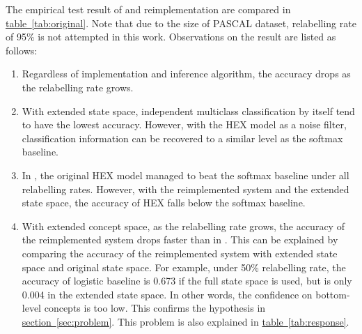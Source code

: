 \documentclass[11pt,a4paper]{article}
\begin{document}
The empirical test result of \cite{deng2014large} and reimplementation are compared in \hyperref[tab:original]{table~\ref{tab:original}}. Note that due to the size of PASCAL dataset, relabelling rate of 95\% is not attempted in this work. Observations on the result are listed as follows:
\begin{enumerate}
\item Regardless of implementation and inference algorithm, the accuracy drops as the relabelling rate grows.
\item With extended state space, independent multiclass classification by itself tend to have the lowest accuracy. However, with the HEX model as a noise filter, classification information can be recovered to a similar level as the softmax baseline.
\item In \cite{deng2014large}, the original HEX model managed to beat the softmax baseline under all relabelling rates. However, with the reimplemented system and the extended state space, the accuracy of HEX falls below the softmax baseline.
\item With extended concept space, as the relabelling rate grows, the accuracy of the reimplemented system drops faster than in \cite{deng2014large}. This can be explained by comparing the accuracy of the reimplemented system with extended state space and original state space. For example, under 50\% relabelling rate, the accuracy of logistic baseline is 0.673 if the full state space is used, but is only 0.004 in the extended state space. In other words, the confidence on bottom-level concepts is too low. This confirms the hypothesis in \hyperref[sec:problem]{section~\ref{sec:problem}}. This problem is also explained in \hyperref[tab:response]{table~\ref{tab:response}}.
\end{enumerate}
\end{document}
